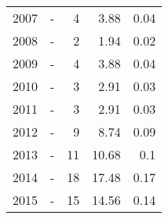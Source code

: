 \begin{longtable}{lXrrr}
        2007 & \multicolumn{1}{X}{-} & %
          \num{4} &
          \num[round-mode=places,round-precision=2]{3.88} &
          \num[round-mode=places,round-precision=2]{0.04} \\

        2008 & \multicolumn{1}{X}{-} & %
          \num{2} &
          \num[round-mode=places,round-precision=2]{1.94} &
          \num[round-mode=places,round-precision=2]{0.02} \\

        2009 & \multicolumn{1}{X}{-} & %
          \num{4} &
          \num[round-mode=places,round-precision=2]{3.88} &
          \num[round-mode=places,round-precision=2]{0.04} \\

        2010 & \multicolumn{1}{X}{-} & %
          \num{3} &
          \num[round-mode=places,round-precision=2]{2.91} &
          \num[round-mode=places,round-precision=2]{0.03} \\

        2011 & \multicolumn{1}{X}{-} & %
          \num{3} &
          \num[round-mode=places,round-precision=2]{2.91} &
          \num[round-mode=places,round-precision=2]{0.03} \\

        2012 & \multicolumn{1}{X}{-} & %
          \num{9} &
          \num[round-mode=places,round-precision=2]{8.74} &
          \num[round-mode=places,round-precision=2]{0.09} \\

        2013 & \multicolumn{1}{X}{-} & %
          \num{11} &
          \num[round-mode=places,round-precision=2]{10.68} &
          \num[round-mode=places,round-precision=2]{0.1} \\

        2014 & \multicolumn{1}{X}{-} & %
          \num{18} &
          \num[round-mode=places,round-precision=2]{17.48} &
          \num[round-mode=places,round-precision=2]{0.17} \\

        2015 & \multicolumn{1}{X}{-} & %
          \num{15} &
          \num[round-mode=places,round-precision=2]{14.56} &
          \num[round-mode=places,round-precision=2]{0.14} \\


\end{longtable}
